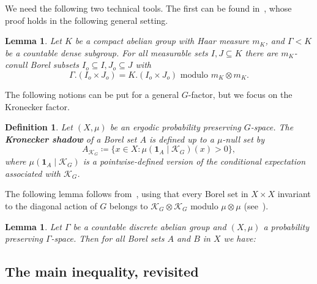 \documentclass{amsart}
\numberwithin{equation}{subsection}
\newtheorem{lem}[thm]{Lemma}
\newtheorem{defn}[thm]{Definition}
\theoremstyle{remark}
\newcommand{\diag}{\textsubscript{\raisebox{0.4ex}{\scalebox{0.6}{\(\blacktriangle\)}}}}\xspace
\begin{document}
We need the following two technical tools. The first can be found in~\cite[Proposition 4.1]{BjFi2019}, whose proof holds in the following general setting.

\begin{lem}\label{lem:ijprime}
Let \(K\) be a compact abelian group with Haar measure \(m_{K}\), and \(\Gamma<K\) be a countable dense subgroup. For all measurable sets \(I,J\subseteq K\) there are \(m_{K}\)-conull Borel subsets \(I_{o}\subseteq I,J_{o}\subseteq J\) with
\[\Gamma.\left(I_{o}\times J_{o}\right)=K.\left(I_{o}\times J_{o}\right)\text{ modulo }m_{K}\otimes m_{K}.\]
\end{lem}

The following notions can be put for a general \(G\)-factor, but we focus on the Kronecker factor.

\begin{defn}
Let \(\left(X,\mu\right)\) be an ergodic probability preserving \(G\)-space. The {\bf Kronecker shadow} of a Borel set \(A\) is defined up to a \(\mu\)-null set by
\[A_{\mathcal{K}_{G}}\coloneqq \{x\in X:\mu\left(\mathbf{1}_{A}\mid\mathcal{K}_{G}\right)\left(x\right)>0\},\]
where \(\mu\left(\mathbf{1}_{A}\mid\mathcal{K}_{G}\right)\) is a pointwise-defined version of the conditional expectation associated with \(\mathcal{K}_{G}\).
\end{defn}

The following lemma follows from~\cite[Lemma 2.4]{BjFi2019}, using that every Borel set in \(X\times X\) invariant to the diagonal action of \(G\) belongs to \(\mathcal{K}_{G}\otimes\mathcal{K}_{G}\) modulo \(\mu\otimes\mu\) (see~\cite[Lemma 2.3]{BjFi2019}).

\begin{lem}\label{lem:shad}
Let \(\Gamma\) be a countable discrete abelian group and \(\left(X,\mu\right)\) a probability preserving \(\Gamma\)-space. Then for all Borel sets \(A\) and \(B\) in \(X\) we have:
\end{lem}

\subsection{The main inequality, revisited}
\end{document}
